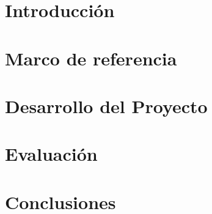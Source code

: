 \documentclass[11pt,oneside]{thesis}
\begin{document}
\maketitle

\makecoverletter


\clearpage






\cleardoublepage
\tableofcontents 
\listoffigures   \listoftables   \mainmatter

\dominitoc
\cleardoublepage

\chapter{Introducción}


\chapter{Marco de referencia}


\chapter{Desarrollo del Proyecto}



\chapter{Evaluación}


\chapter{Conclusiones}


\appendix





\end{document}
